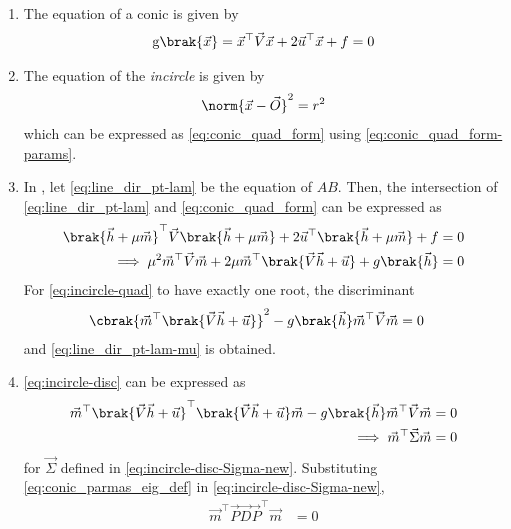 \begin{enumerate}[label=\thesubsection.\arabic*,ref=\thesubsection.\theenumi]
\item
The equation of  a conic  is given by
		\begin{align}
    \label{eq:conic_quad_form}
	\text{g}\brak{\vec{x}} = \vec{x}^{\top}\vec{V}\vec{x}+2\vec{u}^{\top}\vec{x}+f=0
    \end{align}
	\item The equation of the {\em incircle} is given by 
		\begin{align}
			\label{eq:incircle}
			\norm{\vec{x}-\vec{O}}^2 = r^2
		\end{align}
		which can be expressed as 
			 \eqref{eq:conic_quad_form}
			 using 
			 \eqref{eq:conic_quad_form-params}.
		 \item 	In , 
let 
  \eqref{eq:line_dir_pt-lam}
  be the equation of $AB$.  Then, the intersection of 
  \eqref{eq:line_dir_pt-lam}
  and 
			 \eqref{eq:conic_quad_form}
			 can be expressed as 
\begin{align}
\brak{\vec{h} + \mu{\vec{m}}}^{\top}
\vec{V}
\brak{\vec{h} + \mu{\vec{m}}}
			+2\vec{u}^{\top}\brak{\vec{h} + \mu{\vec{m}}}+f &= 0
			\\
\implies \mu^2\vec{m}^{\top} \vec{V}\vec{m} + 2\mu \vec{m}^{\top}\brak{\vec{V}\vec{h}+\vec{u}}+g\brak{\vec{h}} &= 0 
	\label{eq:incircle-quad}
\end{align}
For 	\eqref{eq:incircle-quad} to have exactly one root, the discriminant
\begin{align}
 \cbrak{\vec{m}^{\top}\brak{\vec{V}\vec{h}+\vec{u}}}^2 -g\brak{\vec{h}}\vec{m}^{\top} \vec{V}\vec{m}  &= 0 
	\label{eq:incircle-disc}
\end{align}
and 
  \eqref{eq:line_dir_pt-lam-mu}
  is obtained.
  \item 
	\eqref{eq:incircle-disc}
	can be expressed as
\begin{align}
\vec{m}^{\top}\brak{\vec{V}\vec{h}+\vec{u}}^{\top}\brak{\vec{V}\vec{h}+\vec{u}}\vec{m}-g\brak{\vec{h}}\vec{m}^{\top} \vec{V}\vec{m}  &= 0 
\\
\implies \vec{m}^{\top}\vec{\Sigma}\vec{m} &= 0
	\label{eq:incircle-disc-Sigma-new}
\end{align}
for $\vec{\Sigma}$ defined in 
	\eqref{eq:incircle-disc-Sigma-new}.
      Substituting \eqref{eq:conic_parmas_eig_def}
	in \eqref{eq:incircle-disc-Sigma-new},
\begin{align}
\vec{m}^{\top}\vec{P}\vec{D}\vec{P}^{\top}\vec{m} &= 0
\\

\end{align}
\end{enumerate}
